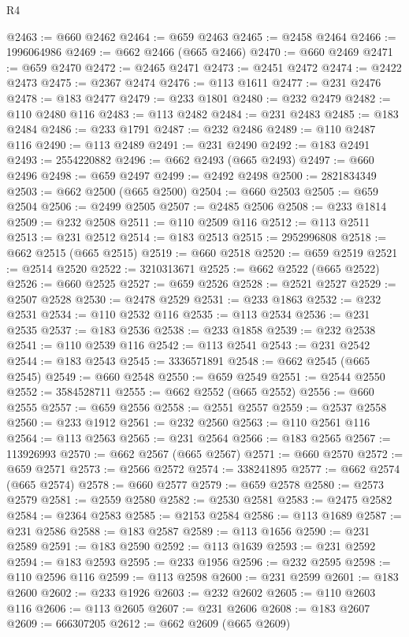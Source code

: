 \begin{lexlean}{R4}
\begin{coremodule}
@2463 := @660 @2462
@2464 := @659 @2463
@2465 := @2458 @2464
@2466 := 1996064986
@2469 := @662 @2466 (@665 @2466)
@2470 := @660 @2469
@2471 := @659 @2470
@2472 := @2465 @2471
@2473 := @2451 @2472
@2474 := @2422 @2473
@2475 := @2367 @2474
@2476 := @113 @1611
@2477 := @231 @2476
@2478 := @183 @2477
@2479 := @233 @1801
@2480 := @232 @2479
@2482 := @110 @2480 @116
@2483 := @113 @2482
@2484 := @231 @2483
@2485 := @183 @2484
@2486 := @233 @1791
@2487 := @232 @2486
@2489 := @110 @2487 @116
@2490 := @113 @2489
@2491 := @231 @2490
@2492 := @183 @2491
@2493 := 2554220882
@2496 := @662 @2493 (@665 @2493)
@2497 := @660 @2496
@2498 := @659 @2497
@2499 := @2492 @2498
@2500 := 2821834349
@2503 := @662 @2500 (@665 @2500)
@2504 := @660 @2503
@2505 := @659 @2504
@2506 := @2499 @2505
@2507 := @2485 @2506
@2508 := @233 @1814
@2509 := @232 @2508
@2511 := @110 @2509 @116
@2512 := @113 @2511
@2513 := @231 @2512
@2514 := @183 @2513
@2515 := 2952996808
@2518 := @662 @2515 (@665 @2515)
@2519 := @660 @2518
@2520 := @659 @2519
@2521 := @2514 @2520
@2522 := 3210313671
@2525 := @662 @2522 (@665 @2522)
@2526 := @660 @2525
@2527 := @659 @2526
@2528 := @2521 @2527
@2529 := @2507 @2528
@2530 := @2478 @2529
@2531 := @233 @1863
@2532 := @232 @2531
@2534 := @110 @2532 @116
@2535 := @113 @2534
@2536 := @231 @2535
@2537 := @183 @2536
@2538 := @233 @1858
@2539 := @232 @2538
@2541 := @110 @2539 @116
@2542 := @113 @2541
@2543 := @231 @2542
@2544 := @183 @2543
@2545 := 3336571891
@2548 := @662 @2545 (@665 @2545)
@2549 := @660 @2548
@2550 := @659 @2549
@2551 := @2544 @2550
@2552 := 3584528711
@2555 := @662 @2552 (@665 @2552)
@2556 := @660 @2555
@2557 := @659 @2556
@2558 := @2551 @2557
@2559 := @2537 @2558
@2560 := @233 @1912
@2561 := @232 @2560
@2563 := @110 @2561 @116
@2564 := @113 @2563
@2565 := @231 @2564
@2566 := @183 @2565
@2567 := 113926993
@2570 := @662 @2567 (@665 @2567)
@2571 := @660 @2570
@2572 := @659 @2571
@2573 := @2566 @2572
@2574 := 338241895
@2577 := @662 @2574 (@665 @2574)
@2578 := @660 @2577
@2579 := @659 @2578
@2580 := @2573 @2579
@2581 := @2559 @2580
@2582 := @2530 @2581
@2583 := @2475 @2582
@2584 := @2364 @2583
@2585 := @2153 @2584
@2586 := @113 @1689
@2587 := @231 @2586
@2588 := @183 @2587
@2589 := @113 @1656
@2590 := @231 @2589
@2591 := @183 @2590
@2592 := @113 @1639
@2593 := @231 @2592
@2594 := @183 @2593
@2595 := @233 @1956
@2596 := @232 @2595
@2598 := @110 @2596 @116
@2599 := @113 @2598
@2600 := @231 @2599
@2601 := @183 @2600
@2602 := @233 @1926
@2603 := @232 @2602
@2605 := @110 @2603 @116
@2606 := @113 @2605
@2607 := @231 @2606
@2608 := @183 @2607
@2609 := 666307205
@2612 := @662 @2609 (@665 @2609)

\end{coremodule}
\end{lexlean}

